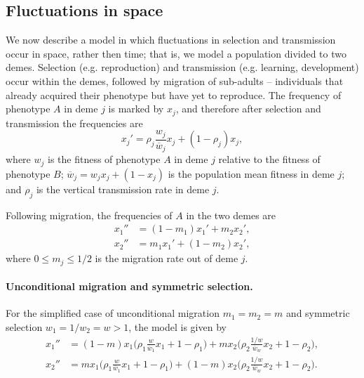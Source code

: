 \documentclass[11pt]{extarticle}
\begin{document}
\subsection*{Fluctuations in space}

We now describe a model in which fluctuations in selection and transmission occur in space, rather then time; that is, we model a population divided to two demes.
Selection (e.g. reproduction) and transmission (e.g. learning, development) occur within the demes, followed by migration of sub-adults -- individuals that already acquired their phenotype but have yet to reproduce.
The frequency of phenotype $A$ in deme $j$ is marked by $x_j$, and therefore after selection and transmission the frequencies are 
\begin{equation} \label{eq:migration_model_selection_transmission}
x_j' = \rho_j \frac{w_j}{\overline{w}_j} x_j + (1-\rho_j) x_j,
\end{equation}
where $w_j$ is the fitness of phenotype $A$ in deme $j$ relative to the fitness of phenotype $B$; $\overline{w}_j=w_j x_j + (1-x_j)$ is the population mean fitness in deme $j$; and $\rho_j$ is the vertical transmission rate in deme $j$.

Following migration, the frequencies of $A$ in the two demes are
\begin{equation} \label{eq:migration_model}
\begin{aligned}
x_1'' &= (1-m_1) x_1' + m_2 x_2', \\
x_2'' &= m_1 x_1' + (1-m_2) x_2',
\end{aligned}
\end{equation}
where $0 \le m_j \le 1/2$ is the migration rate out of deme $j$. 

\paragraph{Unconditional migration and symmetric selection.}
 
For the simplified case of unconditional migration $m_1=m_2=m$ \citep{McPeek1992} and symmetric selection $w_1=1/w_2=w>1$, the model is given by
\begin{equation}\begin{aligned} \label{eq:migration_model_unconditional_symmetric}
x_1'' &= (1-m)x_1\Big(\rho_1 \frac{w}{\overline w_1} x_1 + 1-\rho_1 \Big) + m x_2\Big(\rho_2 \frac{1/w}{\overline w_w} x_2 + 1-\rho_2 \Big), \\
x_2'' &= m x_1\Big(\rho_1 \frac{w}{\overline w_1} x_1 + 1-\rho_1 \Big) + (1-m) x_2\Big(\rho_2 \frac{1/w}{\overline w_w} x_2 + 1-\rho_2 \Big).
\end{aligned}
\end{equation}
\end{document}

